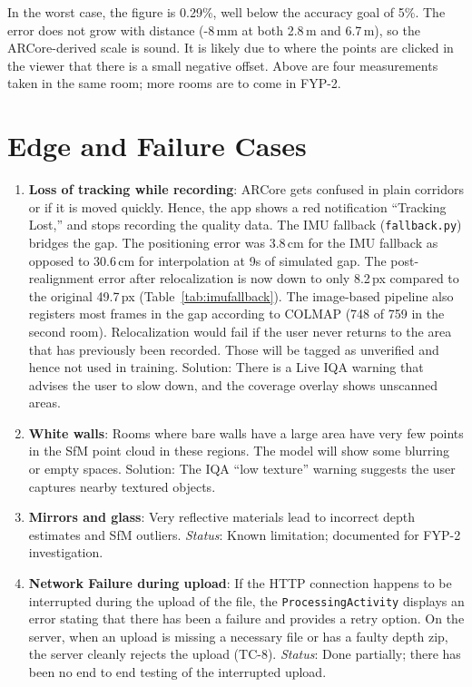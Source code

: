 In the worst case, the figure is 0.29\%, well below the accuracy goal of 5\%. The error does not grow with distance (-8\,mm at both 2.8\,m and 6.7\,m), so the ARCore-derived scale is sound. It is likely due to where the points are clicked in the viewer that there is a small negative offset. Above are four measurements taken in the same room; more rooms are to come in FYP-2.

\section{Edge and Failure Cases}

\begin{enumerate}
    \item \textbf{Loss of tracking while recording}: ARCore gets confused in plain corridors or if it is moved quickly. Hence, the app shows a red notification ``Tracking Lost,'' and stops recording the quality data. The IMU fallback (\texttt{fallback.py}) bridges the gap. The positioning error was 3.8\,cm for the IMU fallback as opposed to 30.6\,cm for interpolation at 9s of simulated gap. The post-realignment error after relocalization is now down to only 8.2\,px compared to the original 49.7\,px (Table~\ref{tab:imufallback}). The image-based pipeline also registers most frames in the gap according to COLMAP (748 of 759 in the second room). Relocalization would fail if the user never returns to the area that has previously been recorded. Those will be tagged as unverified and hence not used in training. Solution: There is a Live IQA warning that advises the user to slow down, and the coverage overlay shows unscanned areas.

    \item \textbf{White walls}: Rooms where bare walls have a large area have very few points in the SfM point cloud in these regions. The model will show some blurring or empty spaces. Solution: The IQA ``low texture'' warning suggests the user captures nearby textured objects.

    \item \textbf{Mirrors and glass}: Very reflective materials lead to incorrect depth estimates and SfM outliers. \emph{Status}: Known limitation; documented for FYP-2 investigation.

    \item \textbf{Network Failure during upload}: If the HTTP connection happens to be interrupted during the upload of the file, the \texttt{ProcessingActivity} displays an error stating that there has been a failure and provides a retry option. On the server, when an upload is missing a necessary file or has a faulty depth zip, the server cleanly rejects the upload (TC-8). \emph{Status}: Done partially; there has been no end to end testing of the interrupted upload.


\end{enumerate}
